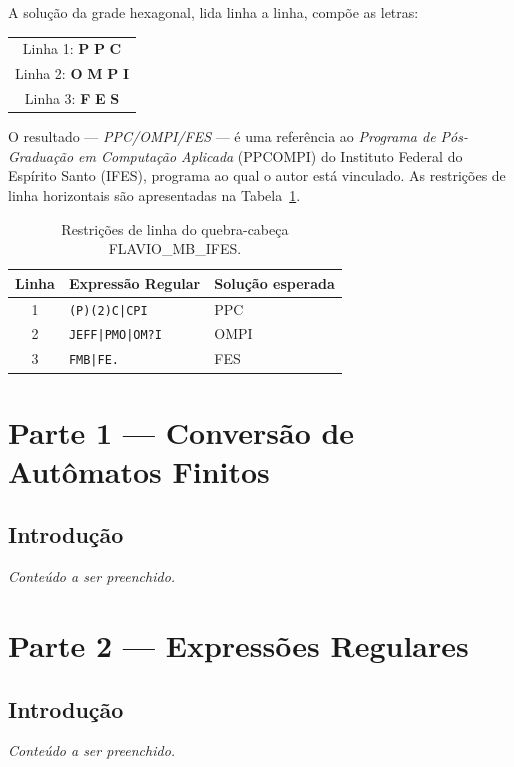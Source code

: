 \documentclass[sumario=abnt-6027-2012]{ifes8}
\newcommand{\rx}[1]{\texttt{#1}}           %
\newcommand{\celula}[1]{\textbf{#1}}       %
\begin{document}
A solução da grade hexagonal, lida linha a linha, compõe as letras:

\begin{center}
\begin{tabular}{ccc}
  \multicolumn{3}{c}{Linha 1: \celula{P} \celula{P} \celula{C}} \\
  \multicolumn{3}{c}{Linha 2: \celula{O} \celula{M} \celula{P} \celula{I}} \\
  \multicolumn{3}{c}{Linha 3: \celula{F} \celula{E} \celula{S}} \\
\end{tabular}
\end{center}

O resultado — \textit{PPC/OMPI/FES} — é uma referência ao
\textit{Programa de Pós-Graduação em Computação Aplicada} (PPCOMPI) do
Instituto Federal do Espírito Santo (IFES), programa ao qual o autor está
vinculado. As restrições de linha horizontais são apresentadas na
Tabela~\ref{tab:puzzle2-linhas}.

\begin{table}[H]
  \centering
  \caption{Restrições de linha do quebra-cabeça FLAVIO\_MB\_IFES.}
  \label{tab:puzzle2-linhas}
  \begin{tabular}{clp{5cm}}
    \toprule
    \textbf{Linha} & \textbf{Expressão Regular} & \textbf{Solução esperada} \\
    \midrule
    1 & \rx{(P)(2)C|CPI}   & PPC \\
    2 & \rx{JEFF|PMO|OM?I}  & OMPI \\
    3 & \rx{FMB|FE.}        & FES \\
    \bottomrule
  \end{tabular}
\end{table}

\chapter{Parte 1 — Conversão de Autômatos Finitos}

\section{Introdução}

\textit{Conteúdo a ser preenchido.}

\chapter{Parte 2 — Expressões Regulares}

\section{Introdução}

\textit{Conteúdo a ser preenchido.}
\end{document}
